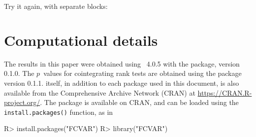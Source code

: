 \documentclass[article]{jss}
\begin{document}
Try it again, with separate blocks:

\begin{CodeChunk} 
\end{CodeChunk} 



%
%







\section*{Computational details}


The results in this paper were obtained using
~4.0.5 with the  package,
version 0.1.0. 
% 
The $p$~values for cointegrating rank tests are obtained using the 
 package version 0.1.1. 
% 
 itself,
in addition to each package used in this document, 
is also available from the Comprehensive
 Archive Network (CRAN) at
\url{https://CRAN.R-project.org/}.
% 
The  package is available on CRAN, 
and can be loaded using the \verb|install.packages()| function, as in 

\begin{Code}
R> install.packages("FCVAR")
R> library("FCVAR")
\end{Code}
\end{document}
